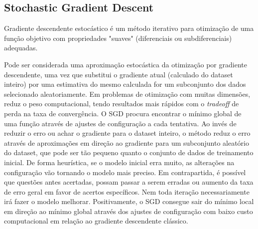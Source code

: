 \subsection{Stochastic Gradient Descent}

Gradiente descendente estocástico é um método iterativo para otimização de uma função objetivo com propriedades "suaves" (diferenciais ou subdiferenciais) adequadas. \cite{ruder2016overview}

Pode ser considerada uma aproximação estocástica da otimização por gradiente descendente, uma vez que substitui o gradiente atual (calculado do dataset inteiro) por uma estimativa do mesmo calculada for um subconjunto dos dados selecionado aleatoriamente.
Em problemas de otimização com muitas dimensões, reduz o peso computacional, tendo resultados mais rápidos com o \textit{tradeoff} de perda na taxa de convergência.
O SGD procura encontrar o mínimo global de uma função através de ajustes de configuração a cada tentativa. Ao invés de reduzir o erro ou achar o gradiente para o dataset inteiro, o método reduz o erro através de aproximações em direção ao gradiente para um subconjunto aleatório do dataset, que pode ser tão pequeno quanto o conjunto de dados de treinamento inicial.
De forma heurística, se o modelo inicial erra muito, as alterações na configuração vão tornando o modelo mais preciso. Em contrapartida, é possível que questões antes acertadas, possam passar a serem erradas ou aumento da taxa de erro geral em favor de acertos específicos. Nem toda iteração necessariamente irá fazer o modelo melhorar.
Positivamente, o SGD consegue sair do mínimo local em direção ao mínimo global através dos ajustes de configuração com baixo custo computacional em relação ao gradiente descendente clássico.
\cite{overview_gradient_descent_stochastic}

